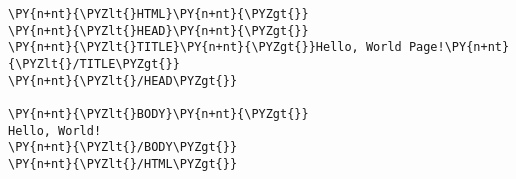 \begin{Verbatim}[commandchars=\\\{\}]
\PY{n+nt}{\PYZlt{}HTML}\PY{n+nt}{\PYZgt{}}
\PY{n+nt}{\PYZlt{}HEAD}\PY{n+nt}{\PYZgt{}}
\PY{n+nt}{\PYZlt{}TITLE}\PY{n+nt}{\PYZgt{}}Hello, World Page!\PY{n+nt}{\PYZlt{}/TITLE\PYZgt{}}
\PY{n+nt}{\PYZlt{}/HEAD\PYZgt{}}

\PY{n+nt}{\PYZlt{}BODY}\PY{n+nt}{\PYZgt{}}
Hello, World!
\PY{n+nt}{\PYZlt{}/BODY\PYZgt{}}
\PY{n+nt}{\PYZlt{}/HTML\PYZgt{}}
\end{Verbatim}
